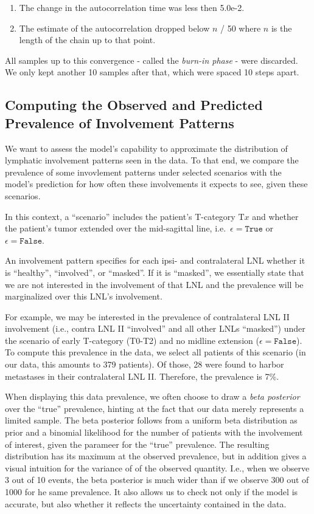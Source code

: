 \documentclass[
  sn-mathphys-num,
]{sn-jnl}
\providecommand{\tightlist}{%
  \setlength{\itemsep}{0pt}\setlength{\parskip}{0pt}}\usepackage{longtable,booktabs,array}
\begin{document}
\begin{enumerate}
\def\labelenumi{\arabic{enumi}.}
\tightlist
\item
  The change in the autocorrelation time was less then 5.0e-2.
\item
  The estimate of the autocorrelation dropped below \(n\) / 50 where
  \(n\) is the length of the chain up to that point.
\end{enumerate}

All samples up to this convergence - called the \emph{burn-in phase} -
were discarded. We only kept another 10 samples after that, which were
spaced 10 steps apart.

\subsection{Computing the Observed and Predicted Prevalence of
Involvement Patterns}\label{sec-prevalence}

We want to assess the model's capability to approximate the distribution
of lymphatic involvement patterns seen in the data. To that end, we
compare the prevalence of some invovlement patterns under selected
scenarios with the model's prediction for how often these involvements
it expects to see, given these scenarios.

In this context, a ``scenario'' includes the patient's T-category
\(\text{T}x\) and whether the patient's tumor extended over the
mid-sagittal line, i.e.~\(\epsilon=\texttt{True}\) or
\(\epsilon=\texttt{False}\).

An involvement pattern specifies for each ipsi- and contralateral LNL
whether it is ``healthy'', ``involved'', or ``masked''. If it is
``masked'', we essentially state that we are not interested in the
involvement of that LNL and the prevalence will be marginalized over
this LNL's involvement.

For example, we may be interested in the prevalence of contralateral LNL
II involvement (i.e., contra LNL II ``involved'' and all other LNLs
``masked'') under the scenario of early T-category (T0-T2) and no
midline extension (\(\epsilon=\texttt{False}\)). To compute this
prevalence in the data, we select all patients of this scenario (in our
data, this amounts to 379 patients). Of those, 28 were found to harbor
metastases in their contralateral LNL II. Therefore, the prevalence is
7\%.

When displaying this data prevalence, we often choose to draw a
\emph{beta posterior} over the ``true'' prevalence, hinting at the fact
that our data merely represents a limited sample. The beta posterior
follows from a uniform beta distribution as prior and a binomial
likelihood for the number of patients with the involvement of interest,
given the parameer for the ``true'' prevalence. The resulting
distribution has its maximum at the observed prevalence, but in addition
gives a visual intuition for the variance of of the observed quantity.
I.e., when we observe 3 out of 10 events, the beta posterior is much
wider than if we observe 300 out of 1000 for he same prevalence. It also
allows us to check not only if the model is accurate, but also whether
it reflects the uncertainty contained in the data.
\end{document}
